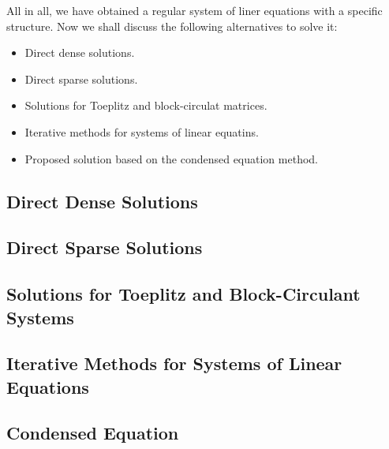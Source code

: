 All in all, we have obtained a regular system of liner equations with a specific structure. Now we shall discuss the following alternatives to solve it:
\begin{itemize}
  \item Direct dense solutions.
  \item Direct sparse solutions.
  \item Solutions for Toeplitz and block-circulat matrices.
  \item Iterative methods for systems of linear equatins.
  \item Proposed solution based on the condensed equation method.
\end{itemize}

\subsection{Direct Dense Solutions}


\subsection{Direct Sparse Solutions}


\subsection{Solutions for Toeplitz and Block-Circulant Systems}


\subsection{Iterative Methods for Systems of Linear Equations}


\subsection{Condensed Equation}

